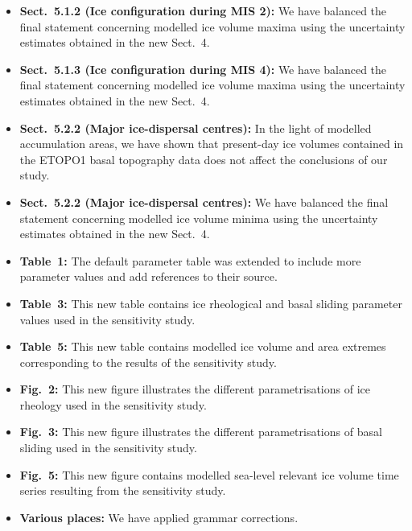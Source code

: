 \begin{itemize}
    \item \textbf{Sect.~5.1.2 (Ice configuration during MIS 2):}
    We have balanced the final statement concerning modelled ice volume maxima
    using the uncertainty estimates obtained in the new Sect.~4.

    \item \textbf{Sect.~5.1.3 (Ice configuration during MIS 4):}
    We have balanced the final statement concerning modelled ice volume maxima
    using the uncertainty estimates obtained in the new Sect.~4.

    \item \textbf{Sect.~5.2.2 (Major ice-dispersal centres):}
    In the light of modelled accumulation areas, we have shown that present-day
    ice volumes contained in the ETOPO1 basal topography data does not affect
    the conclusions of our study.

    \item \textbf{Sect.~5.2.2 (Major ice-dispersal centres):}
    We have balanced the final statement concerning modelled ice volume minima
    using the uncertainty estimates obtained in the new Sect.~4.

    \item \textbf{Table~1:}
    The default parameter table was extended to include more parameter values
    and add references to their source.

    \item \textbf{Table~3:}
    This new table contains ice rheological and basal sliding parameter values
    used in the sensitivity study.

    \item \textbf{Table~5:}
    This new table contains modelled ice volume and area extremes corresponding
    to the results of the sensitivity study.

    \item \textbf{Fig.~2:}
    This new figure illustrates the different parametrisations of ice rheology
    used in the sensitivity study.

    \item \textbf{Fig.~3:}
    This new figure illustrates the different parametrisations of basal sliding
    used in the sensitivity study.

    \item \textbf{Fig.~5:}
    This new figure contains modelled sea-level relevant ice volume time series
    resulting from the sensitivity study.

    \item \textbf{Various places:}
    We have applied grammar corrections.

\end{itemize}

